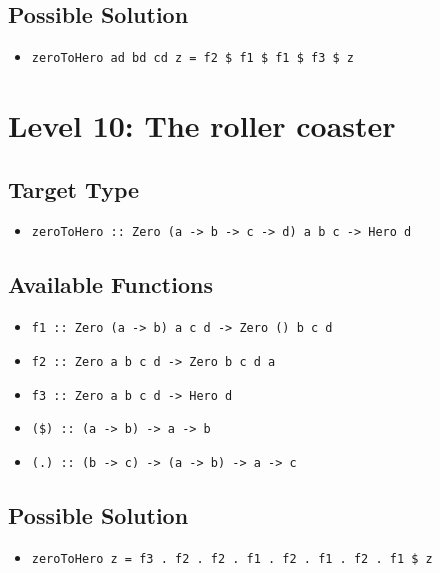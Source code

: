 \subsection{Possible Solution} 
\begin{itemize}
    \item \texttt{zeroToHero ad bd cd z = f2 \$ f1 \$ f1 \$ f3 \$ z}
\end{itemize}


\section{Level 10: The roller coaster}
\subsection{Target Type } 
\begin{itemize}
    \item \texttt{zeroToHero :: Zero (a -> b -> c -> d) a b c  -> Hero d}
\end{itemize}

\subsection{Available Functions} 
\begin{itemize}
    \item \texttt{f1 :: Zero (a -> b) a c d -> Zero () b c d}
    \item \texttt{f2 :: Zero a b c d -> Zero b c d a}
    \item \texttt{f3 :: Zero a b c d -> Hero d}
    \item \texttt{(\$) :: (a -> b) -> a -> b}
    \item \texttt{(.) :: (b -> c) -> (a -> b) -> a -> c}
\end{itemize}

\subsection{Possible Solution} 
\begin{itemize}
    \item \texttt{zeroToHero z = f3 . f2 . f2 . f1 . f2 . f1 . f2 . f1 \$ z}
\end{itemize}